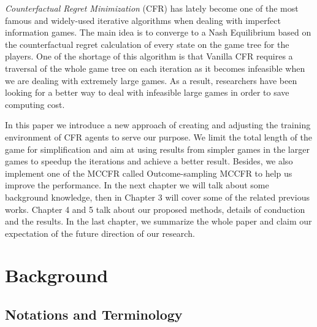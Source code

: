 \documentclass[runningheads]{llncs}
\begin{document}
    \textit{Counterfactual Regret Minimization} (CFR) has lately become one of the most famous and widely-used iterative algorithms when dealing with imperfect information games. The main idea is to converge to a Nash Equilibrium based on the counterfactual regret calculation of every state on the game tree for the players. One of the shortage of this algorithm is that Vanilla CFR requires a traversal of the whole game tree on each iteration as it becomes infeasible when we are dealing with extremely large games. As a result, researchers have been looking for a better way to deal with infeasible large games in order to save computing cost. 

    In this paper we introduce a new approach of creating and adjusting the training environment of CFR agents to serve our purpose. We limit the total length of the game for simplification and aim at using results from simpler games in the larger games to speedup the iterations and achieve a better result. Besides, we also implement one of the MCCFR called Outcome-sampling MCCFR to help us improve the performance. In the next chapter we will talk about some background knowledge, then in Chapter 3 will cover some of the related previous works. Chapter 4 and 5 talk about our proposed methods, details of conduction and the results. In the last chapter, we summarize the whole paper and claim our expectation of the future direction of our research.

\section{Background}
\label{Bac}
    \subsection{Notations and Terminology}
\end{document}
